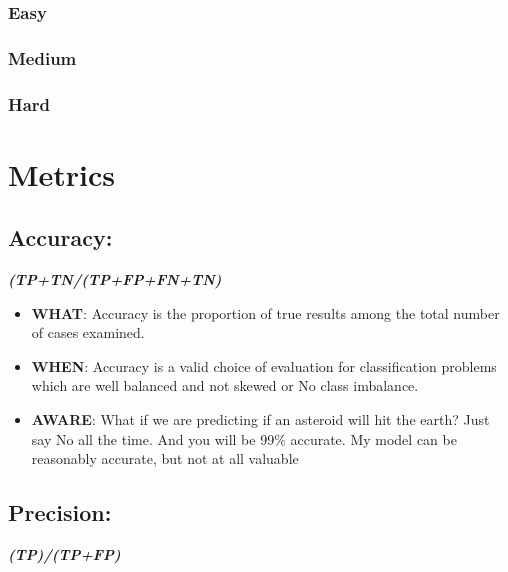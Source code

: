 \documentclass[
]{book}
\begin{document}
\hypertarget{easy-2}{%
\subsection{Easy}\label{easy-2}}

\hypertarget{medium-2}{%
\subsection{Medium}\label{medium-2}}

\hypertarget{hard-2}{%
\subsection{Hard}\label{hard-2}}

\hypertarget{metrics}{%
\chapter{Metrics}\label{metrics}}

\hypertarget{accuracy}{%
\section{Accuracy:}\label{accuracy}}

\textbf{\emph{(TP+TN/(TP+FP+FN+TN)}}

\begin{itemize}
\item
  \textbf{WHAT}: Accuracy is the proportion of true results among the total number of cases examined.
\item
  \textbf{WHEN}: Accuracy is a valid choice of evaluation for classification problems which are well balanced and not skewed or No class imbalance.
\item
  \textbf{AWARE}: What if we are predicting if an asteroid will hit the earth? Just say No all the time. And you will be 99\% accurate. My model can be reasonably accurate, but not at all valuable
\end{itemize}

\hypertarget{precision}{%
\section{Precision:}\label{precision}}

\textbf{\emph{(TP)/(TP+FP)}}
\end{document}
